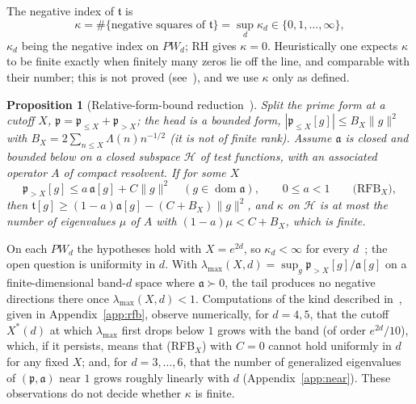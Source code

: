 \documentclass[11pt]{amsart}
\newtheorem{proposition}[theorem]{Proposition}
\theoremstyle{definition}
\theoremstyle{remark}
\newcommand{\fa}{\mathfrak a}
\newcommand{\fp}{\mathfrak p}
\newcommand{\ft}{\mathfrak t}
\begin{document}
The negative index of $\ft$ is
\[
\kappa=\#\{\text{negative squares of }\ft\}=\sup_d\kappa_d\in\{0,1,\dots,\infty\},
\]
$\kappa_d$ being the negative index on $PW_d$; RH gives $\kappa=0$. Heuristically
one expects $\kappa$ to be finite exactly when finitely many zeros lie off the
line, and comparable with their number; this is not proved (see~\cite[\S1]{RP16}),
and we use $\kappa$ only as defined.

\begin{proposition}[Relative-form-bound reduction~{\cite[Prop.~2.1]{RP16}}]\label{prop:rfb}
Split the prime form at a cutoff $X$, $\fp=\fp_{\le X}+\fp_{>X}$; the head is a
bounded form, $|\fp_{\le X}[g]|\le B_X\|g\|^2$ with $B_X=2\sum_{n\le X}\Lambda(n)n^{-1/2}$
(it is not of finite rank). Assume $\fa$ is closed and bounded below on a closed
subspace $\mathcal H$ of test functions, with an associated operator $A$ of
compact resolvent. If for some $X$
\[
\fp_{>X}[g]\le a\,\fa[g]+C\|g\|^2\quad(g\in\operatorname{dom}\fa),\qquad 0\le a<1
\qquad\text{(RFB$_X$)},
\]
then $\ft[g]\ge(1-a)\fa[g]-(C+B_X)\|g\|^2$, and $\kappa$ on $\mathcal H$ is at most
the number of eigenvalues $\mu$ of $A$ with $(1-a)\mu<C+B_X$, which is finite.
\end{proposition}

On each $PW_d$ the hypotheses hold with $X=e^{2d}$, so $\kappa_d<\infty$ for
every $d$~\cite[\S2]{RP16}; the open question is uniformity in $d$. With
$\lambda_{\max}(X,d)=\sup_g\fp_{>X}[g]/\fa[g]$ on a finite-dimensional band-$d$
space where $\fa\succ0$, the tail produces no negative directions there once
$\lambda_{\max}(X,d)<1$. Computations of the kind described in~\cite{RP16}, given in
Appendix~\ref{app:rfb}, observe numerically, for $d=4,5$, that the cutoff
$X^\ast(d)$ at which $\lambda_{\max}$ first drops below $1$ grows with the band
(of order $e^{2d}/10$), which, if it persists, means that (RFB$_X$) with $C=0$
cannot hold uniformly in $d$ for any fixed $X$; and, for $d=3,\dots,6$, that the number
of generalized eigenvalues of $(\fp,\fa)$ near $1$ grows roughly linearly with $d$
(Appendix~\ref{app:near}). These observations do not decide whether $\kappa$ is
finite.
\end{document}
